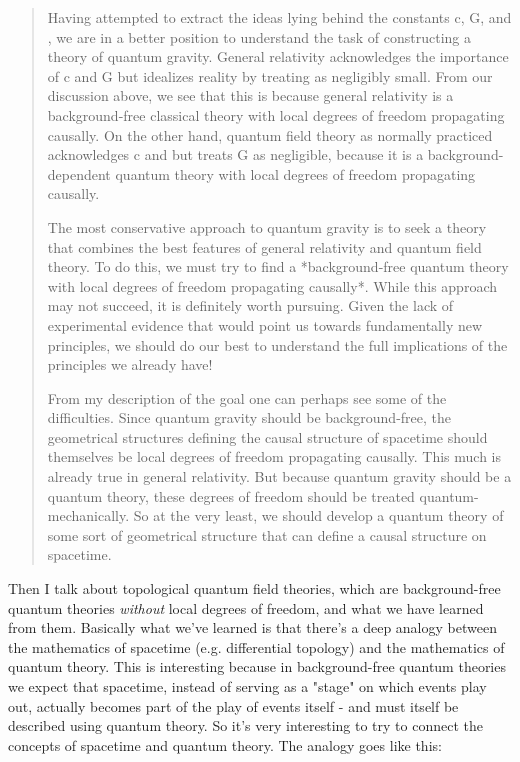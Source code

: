 \begin{quote}
Having attempted to extract the ideas lying behind the constants c, G,
and \hbar , we are in a better position to understand the task of
constructing a theory of quantum gravity.  General relativity
acknowledges the importance of c and G but idealizes reality by treating
\hbar  as negligibly small.  From our discussion above, we see that this
is because general relativity is a background-free classical theory with
local degrees of freedom propagating causally. On the other hand,
quantum field theory as normally practiced acknowledges c and \hbar  but
treats G as negligible, because it is a background-dependent quantum
theory with local degrees of freedom propagating causally.

The most conservative approach to quantum gravity is to seek a theory
that combines the best features of general relativity and quantum field
theory.    To do this, we must try to find a *background-free
quantum theory with local degrees of freedom propagating causally*.
While this approach may not succeed, it is definitely worth pursuing.
Given the lack of experimental evidence that would point us towards 
fundamentally new principles, we should do our best to understand
the full implications of the principles we already have!

From my description of the goal one can perhaps see some of the
difficulties.  Since quantum gravity should be background-free, the
geometrical structures defining the causal structure of spacetime should
themselves be local degrees of freedom propagating causally.  This much
is already true in general relativity.  But because quantum gravity
should be a quantum theory, these degrees of freedom should be treated
quantum-mechanically.  So at the very least, we should develop a quantum
theory of some sort of geometrical structure that can define a causal
structure on spacetime.   
\end{quote}


Then I talk about topological quantum field theories, which are
background-free quantum theories \emph{without} local degrees of freedom, and
what we have learned from them.  Basically what we've learned is that
there's a deep analogy between the mathematics of spacetime
(e.g. differential topology) and the mathematics of quantum theory.
This is interesting because in background-free quantum theories we
expect that spacetime, instead of serving as a "stage" on which events
play out, actually becomes part of the play of events itself - and
must itself be described using quantum theory.  So it's very interesting
to try to connect the concepts of spacetime and quantum theory.  The 
analogy goes like this:


